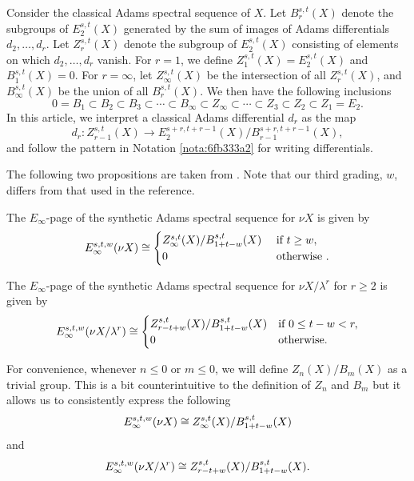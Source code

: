 \documentclass{amsart}
\numberwithin{equation}{section}
\begin{document}
\begin{notation}
    Consider the classical Adams spectral sequence of $X$. Let $B_r^{s,t}(X)$ denote the subgroups of $E_2^{s,t}(X)$ generated by the sum of images of Adams differentials $d_2,\dots,d_r$. Let $Z_r^{s,t}(X)$ denote the subgroup of $E_2^{s,t}(X)$ consisting of elements on which $d_2,\dots,d_r$ vanish. For $r=1$, we define $Z_1^{s,t}(X)=E_2^{s,t}(X)$ and $B_1^{s,t}(X)=0$. For $r=\infty$, let $Z_\infty^{s,t}(X)$ be the intersection of all $Z_r^{s,t}(X)$, and $B_\infty^{s,t}(X)$ be the union of all $B_r^{s,t}(X)$. We then have the following inclusions
    $$0 = B_1 \subset B_2\subset B_3\subset \cdots\subset B_\infty\subset Z_\infty \subset \cdots\subset Z_3\subset Z_2\subset Z_1 = E_2.$$
    In this article, we interpret a classical Adams differential $d_r$ as the map
    $$d_r: Z_{r-1}^{s,t}(X)\to E_2^{s+r,t+r-1}(X)/B_{r-1}^{s+r,t+r-1}(X),$$
    and follow the pattern in Notation \ref{nota:6fb333a2} for writing differentials.
\end{notation}

The following two propositions are taken from \cite[Corollary A.9, A.11]{BHS}. Note that our third grading, $w$, differs from that used in the reference.

\begin{proposition}\label{prop:30e8b746}
    The $E_\infty$-page of the synthetic Adams spectral sequence for $\nu X$ is given by
    $$E_\infty^{s,t,w}(\nu X)\cong\begin{cases}
        Z_\infty^{s,t}(X)/B_{1+t-w}^{s,t}(X) & \text{ if } t \ge w,\\
        0 & \text{ otherwise }.
    \end{cases}$$
\end{proposition}

\begin{proposition}\label{prop:59f111f}
    The $E_\infty$-page of the synthetic Adams spectral sequence for $\nu X/\lambda^r$ for $r\ge 2$ is given by
    $$E_\infty^{s,t,w}(\nu X/\lambda^r)\cong\begin{cases}
        Z_{r-t+w}^{s,t}(X)/B_{1+t-w}^{s,t}(X) & \text{if } 0\le t-w < r,\\
        0 & \text{otherwise}.
    \end{cases}$$
\end{proposition}

\begin{notation}
    For convenience, whenever $n\le 0$ or $m\le 0$, we will define $Z_n(X)/B_m(X)$ as a trivial group. This is a bit counterintuitive to the definition of $Z_n$ and $B_m$ but it allows us to consistently express the following
    $$E_\infty^{s,t,w}(\nu X)\cong Z_\infty^{s,t}(X)/B_{1+t-w}^{s,t}(X)$$
    and
    $$E_\infty^{s,t,w}(\nu X/\lambda^r)\cong Z_{r-t+w}^{s,t}(X)/B_{1+t-w}^{s,t}(X).$$
\end{notation}
\end{document}

